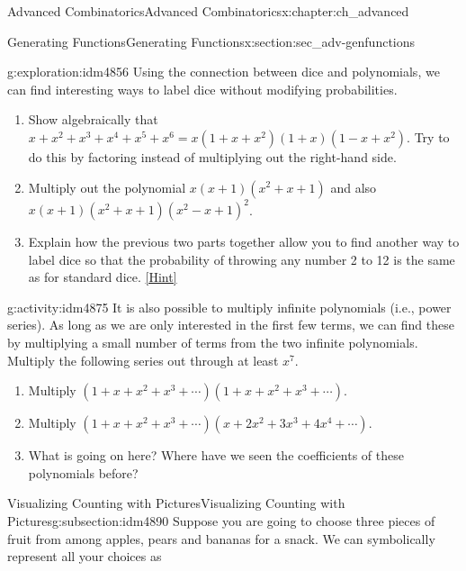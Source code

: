 \documentclass[oneside,10pt,]{book}
\numberwithin{equation}{chapter}
\begin{document}
\begin{chapterptx}{Advanced Combinatorics}{}{Advanced Combinatorics}{}{}{x:chapter:ch_advanced}
\begin{sectionptx}{Generating Functions}{}{Generating Functions}{}{}{x:section:sec_adv-genfunctions}
\begin{introduction}{}
\begin{exploration}{}{g:exploration:idm4856}%
Using the connection between dice and polynomials, we can find interesting ways to label dice without modifying probabilities.%
\begin{enumerate}[font=\bfseries,label=(\alph*),ref=\alph*]
\item{}Show algebraically that \(x+x^2 + x^3 + x^4 + x^5 + x^6 = x(1+x+x^2)(1+x)(1-x+x^2)\).  Try to do this by factoring instead of multiplying out the right-hand side.%
\item{}Multiply out the polynomial \(x(x+1)(x^2+x+1)\) and also \(x(x+1)(x^2+x+1)(x^2-x+1)^2\).%
\item{}Explain how the previous two parts together allow you to find another way to label dice so that the probability of throwing any number 2 to 12 is the same as for standard dice.%
\space\hspace*{0pt}\hfill{\tiny\hyperlink{g:hint:idm4871-back}{[Hint]}}\end{enumerate}
\end{exploration}
\begin{activity}{}{g:activity:idm4875}%
It is also possible to multiply infinite polynomials (i.e., power series).  As long as we are only interested in the first few terms, we can find these by multiplying a small number of terms from the two infinite polynomials.  Multiply the following series out through at least \(x^7\).%
\begin{enumerate}[font=\bfseries,label=(\alph*),ref=\alph*]
\item{}Multiply \((1+x+x^2+x^3 + \cdots)(1+ x + x^2 + x^3+ \cdots)\).%
\item{}Multiply \((1+x+x^2 + x^3 + \cdots)(x + 2x^2 + 3x^3 + 4x^4 + \cdots)\).%
\item{}What is going on here?  Where have we seen the coefficients of these polynomials before?%
\end{enumerate}
\end{activity}
\end{introduction}%
%
%
\typeout{************************************************}
\typeout{************************************************}
%
\begin{subsectionptx}{Visualizing Counting with Pictures}{}{Visualizing Counting with Pictures}{}{}{g:subsection:idm4890}
Suppose you are going to choose three pieces of fruit from among apples, pears and bananas for a snack.  We can symbolically represent all your choices as%

\end{subsectionptx}
\end{sectionptx}
\end{chapterptx}
\end{document}
